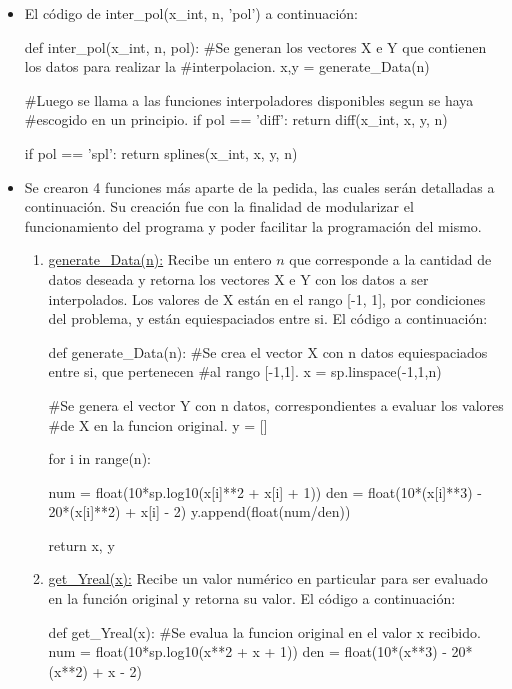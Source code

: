 \documentclass[letter, 10pt]{article}
\begin{document}
\begin{itemize}
\item El c\'odigo de inter\_pol(x\_int, n, 'pol') a continuaci\'on:

\begin{python}
def inter_pol(x_int, n, pol):
#Se generan los vectores X e Y que contienen los datos para realizar la
#interpolacion.
	x,y = generate_Data(n)

#Luego se llama a las funciones interpoladores disponibles segun se haya
#escogido en un principio.
	if pol == 'diff':        
		return diff(x_int, x, y, n)
            
	if pol == 'spl':        
		return splines(x_int, x, y, n)
\end{python}

\item Se crearon 4 funciones m\'as aparte de la pedida, las cuales ser\'an detalladas a continuaci\'on. Su creaci\'on fue con la finalidad de modularizar el funcionamiento del programa y poder facilitar la programaci\'on del mismo.

\begin{enumerate}
\item \underline{generate\_Data(n):} Recibe un entero $n$ que corresponde a la cantidad de datos deseada y retorna los vectores X e Y con los datos a ser interpolados. Los valores de X est\'an en el rango [-1, 1], por condiciones del problema, y est\'an equiespaciados entre si. El c\'odigo a continuaci\'on:

\begin{python}
def generate_Data(n):
#Se crea el vector X con n datos equiespaciados entre si, que pertenecen
#al rango [-1,1].
	x = sp.linspace(-1,1,n)

#Se genera el vector Y con n datos, correspondientes a evaluar los valores
#de X en la funcion original.
	y = []    
    
	for i in range(n): 
        
		num = float(10*sp.log10(x[i]**2 + x[i] + 1))
		den = float(10*(x[i]**3) - 20*(x[i]**2) + x[i] - 2)
		y.append(float(num/den))
    
	return x, y
\end{python}

\item \underline{get\_Yreal(x):} Recibe un valor num\'erico en particular para ser evaluado en la funci\'on original y retorna su valor. El c\'odigo a continuaci\'on:

\begin{python}
def get_Yreal(x):
#Se evalua la funcion original en el valor x recibido.
	num = float(10*sp.log10(x**2 + x + 1))
	den = float(10*(x**3) - 20*(x**2) + x - 2)


\end{python}
\end{enumerate}
\end{itemize}
\end{document}
